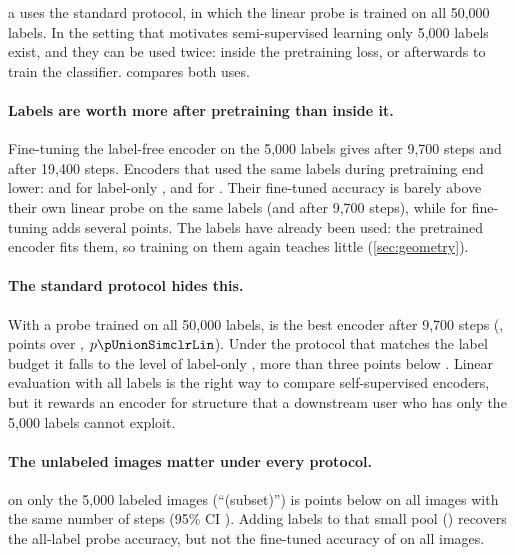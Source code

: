a uses the standard protocol, in which the linear probe is trained on all 50,000 labels. In the
setting that motivates semi-supervised learning only 5,000 labels exist, and they can be used twice: inside
the pretraining loss, or afterwards to train the classifier.  compares both uses.

\paragraph{Labels are worth more after pretraining than inside it.}
Fine-tuning the label-free \simclr encoder on the 5,000 labels gives \simclrFtPm after 9,700 steps and
\simclrTwoHundredFtPm after 19,400 steps. Encoders that used the same labels during pretraining end lower:
\supconFtPm and \supconTwoHundredFtPm for label-only \supcon, \unionFtPm and \unionTwoHundredFtPm for \union.
Their fine-tuned accuracy is barely above their own linear probe on the same labels
(\supconProbeFive and \unionProbeFive after 9,700 steps), while for \simclr fine-tuning adds several points.
The labels have already been used: the pretrained encoder fits them, so training on them again teaches little
(\cref{sec:geometry}).

\paragraph{The standard protocol hides this.}
With a probe trained on all 50,000 labels, \union is the best encoder after 9,700 steps (\unionLinPm,
\diffUnionSimclrLin points over \simclr, $p\pUnionSimclrLin$). Under the protocol that matches the label budget
it falls to the level of label-only \supcon, more than three points below \simclr. Linear evaluation with all labels is the right way to compare self-supervised
encoders, but it rewards an encoder for structure that a downstream user who has only the 5,000 labels cannot
exploit.

\paragraph{The unlabeled images matter under every protocol.}
\simclr on only the 5,000 labeled images (``\simclr (subset)'') is \diffSimclrSubLin points below \simclr on
all images with the same number of steps (95\% CI \ciSimclrSubLin). Adding labels to that small pool
(\supcon) recovers the all-label probe accuracy, but not the fine-tuned accuracy of \simclr on all images.


